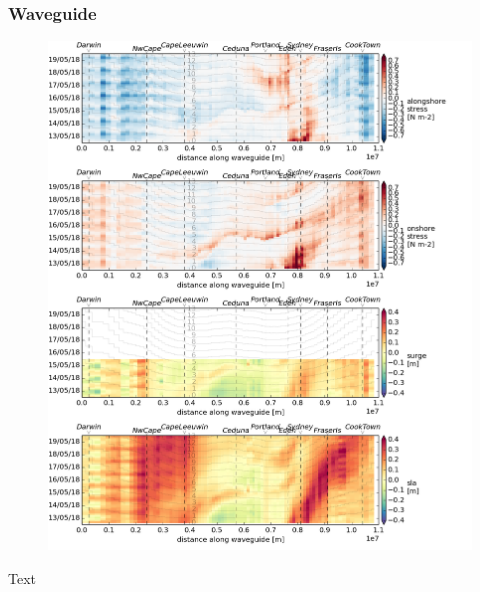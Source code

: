 \begin{frame}
\frametitle{Waveguide}
\begin{minipage}{0.45\textwidth}
    \begin{figure}      
    \includegraphics[width=\textwidth]{figures/plots/collate_g.png}
    \end{figure}
\end{minipage}
\hfill
\begin{minipage}{0.45\textwidth}
    Text
\end{minipage}
\end{frame}